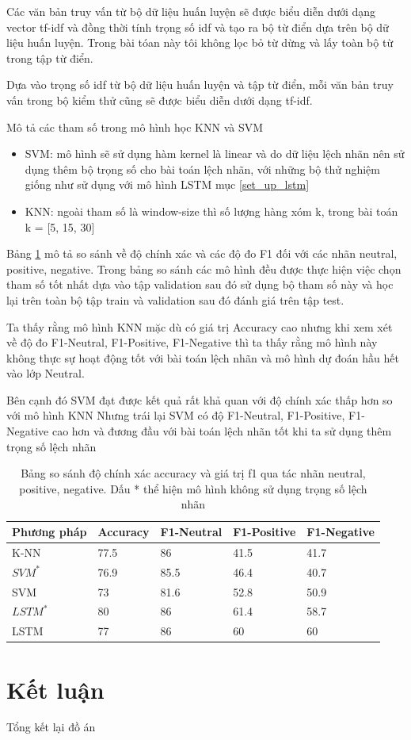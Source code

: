 \documentclass[fontsize=12pt]{scrartcl}
\begin{document}
\par
Các văn bản truy vấn từ bộ dữ liệu huấn luyện sẽ được biểu diễn dưới dạng vector tf-idf và đồng thời tính trọng số idf và tạo ra bộ từ điển dựa trên bộ dữ liệu huấn luyện. Trong bài tóan này tôi không lọc bỏ từ dừng và lấy toàn bộ từ trong tập từ điển.
\par
Dựa vào trọng số idf từ bộ dữ liệu huấn luyện và tập từ điển, mỗi văn bản truy vấn trong bộ kiểm thử cũng sẽ được biểu diễn dưới dạng tf-idf.
\par
Mô tả các tham số trong mô hình học KNN và SVM
\begin{itemize}
\item SVM: mô hình sẽ sử dụng hàm kernel là linear và do dữ liệu lệch nhãn nên sử dụng thêm bộ trọng số cho bài toán lệch nhãn, với những bộ thử nghiệm giống như sử dụng với mô hình LSTM mục \ref{set_up_lstm} 
\item KNN: ngoài tham số là window-size thì số lượng hàng xóm k, trong bài toán k = [5, 15, 30]
\end{itemize}
\par
Bảng \ref{table:compare_lstm} mô tả so sánh về độ chính xác và các độ đo F1 đối với các nhãn neutral, positive, negative. Trong bảng so sánh các mô hình đều được thực hiện việc chọn tham số tốt nhất dựa vào tập validation sau đó sử dụng bộ tham số này và học lại trên toàn bộ tập train và validation sau đó đánh giá trên tập test.
\par
Ta thấy rằng mô hình KNN mặc dù có giá trị Accuracy cao nhưng khi xem xét về độ đo F1-Neutral, F1-Positive, F1-Negative thì ta thấy rằng mô hình này không thực sự hoạt động tốt với bài toán lệch nhãn và mô hình dự đoán hầu hết vào lớp Neutral.
\par
Bên cạnh đó SVM đạt được kết quả rất khả quan với độ chính xác thấp hơn so với mô hình KNN Nhưng trái lại SVM có độ F1-Neutral, F1-Positive, F1-Negative cao hơn và đương đầu với bài toán lệch nhãn tốt khi ta sử dụng thêm trọng số lệch nhãn 
\begin{table}[ht]
\begin{center}
  \begin{tabular}{|l|l|l|l|l|}
  \hline
  Phương pháp & Accuracy & F1-Neutral & F1-Positive & F1-Negative\\
  \hline
  K-NN & 77.5 & 86 & 41.5 & 41.7\\
  \hline
  $SVM^*$ & 76.9 & 85.5 & 46.4 & 40.7\\
  \hline
  SVM & 73 & 81.6 & 52.8 & 50.9\\
  \hline
  $LSTM^*$ & 80 & 86 & 61.4 & 58.7\\
  \hline
  LSTM & 77 & 86 & 60 & 60\\
  \hline
  \end{tabular}
  \end{center}
  \caption{Bảng so sánh độ chính xác accuracy và giá trị f1 qua tác nhãn neutral, positive, negative. Dấu * thể hiện mô hình không sử dụng trọng số lệch nhãn}
  \label{table:compare_lstm}
\end{table}%
\newpage
\section{Kết luận}\label{sec:end}
Tổng kết lại đồ án

\newpage


\end{document}
